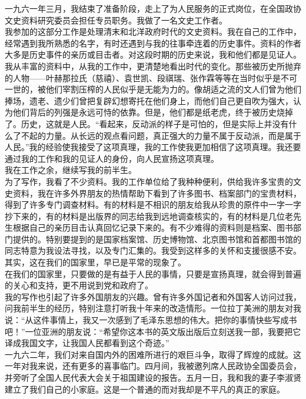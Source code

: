 一九六一年三月，我结束了准备阶段，走上了为人民服务的正式岗位，在全国政协文史资料研究委员会担任专员职务。我做了一名文史工作者。\\

我参加的这部分工作是处理清末和北洋政府时代的文史资料。我在自己的工作中，经常遇到我所熟悉的名字，有时还遇到与我的往事牵连着的历史事件。资料的作者大多是历史事件的亲历或目击者。对这段时期的历史来说，我和他们都是见证人。我从丰富的资料中，从我的工作中，更清楚地看出时代的变化。那些被历史所抛弃的人物——叶赫那拉氏（慈禧）、袁世凯、段祺瑞、张作霖等等在当时似乎是不可一世的，被他们宰割压榨的人民似乎是无能为力的。像胡适之流的文人们曾为他们捧场，遗老、遗少们曾把复辟幻想寄托在他们身上，而他们自己更自吹为强大，认为他们背后的列强是永远可恃的依靠。但是，他们都是纸老虎，终于被历史烧掉了。历史，这就是人民。“看起来，反动派的样子是可怕的，但是实际上并没有什么了不起的力量。从长远的观点看问题，真正强大的力量不属于反动派，而是属于人民。”我的经验使我接受了这项真理，我的工作使我更加相信了这项真理。我还要通过我的工作和我的见证人的身份，向人民宣扬这项真理。\\

我在工作之余，继续写我的前半生。\\

为了写作，我看了不少资料。我的工作单位给了我种种便利，供给我许多宝贵的文史资料，我在许多外界朋友的热情帮助下看到了许多图书、档案部门的宝贵材料，得到了许多专门调查材料。有的材料是不相识的朋友给我从珍贵的原件中一字一字抄下来的，有的材料是出版界的同志给我到远地调查核实的，有的材料是几位老先生根据自己的亲历目击认真回忆记录下来的。有不少难得的资料则是档案、图书部门提供的。特别要提到的是国家档案馆、历史博物馆、北京图书馆和首都图书馆的同志特意为我设法寻找，以及专门汇集的。我受到这样多的关怀和支援很感不安。其实，这在我们的国家里，早已是平常的现象了。\\

在我们的国家里，只要做的是有益于人民的事情，只要是宣扬真理，就会得到普遍的关心和支持，更不用说到党和政府了。\\

我的写作也引起了许多外国朋友的兴趣。曾有许多外国记者和外国客人访问过我，问我前半生的经历，特别注意打听我十年来的改造情形。一位拉丁美洲的朋友对我说：“从这件事情上，我又一次感到了毛泽东思想的伟大。把你的事情快些写成书吧！”一位亚洲的朋友说：“希望你这本书的英文版出版后立刻送我一部，我要把它译成我国文字，让我国人民都看到这个奇迹。”\\

一九六二年，我们对来自国内外的困难所进行的艰巨斗争，取得了辉煌的成就。这一年对我来说，还有更多的喜事临门。四月间，我被邀列席人民政协全国委员会，并旁听了全国人民代表大会关于祖国建设的报告。五月一日，我和我的妻子李淑贤建立了我们自己的小家庭。这是一个普通的而对我却是不平凡的真正的家庭。\\

